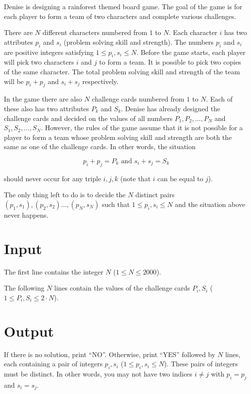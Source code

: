 

Denise is designing a rainforest themed board game. The goal of the game is for each player to form a 
team of two characters and complete various challenges.

There are $N$ different characters numbered from $1$ to $N$.
Each character $i$ has two attributes $p_i$ and $s_i$ (problem solving skill and strength).
The numbers $p_i$ and $s_i$ are positive integers satisfying $1 \leq p_i, s_i \leq N$.
Before the game starts, each player will pick two characters $i$ and $j$ to form a team. 
It is possible to pick two copies of the same character.
The total problem solving skill and strength of the team will be $p_i + p_j$ and $s_i + s_j$
respectively. 

In the game there are also $N$ challenge cards numbered from $1$ to $N$. Each of these also
has two attributes $P_k$ and $S_k$. Denise has already designed the challenge cards and 
decided on the values of all numbers $P_1, P_2, \dots, P_N$ and $S_1, S_2, \dots, S_N$. 
However, the rules of the game assume that it is not possible for a player to form a team
whose problem solving skill and strength are both the same as one of the challenge cards. In other 
words, the situation 

$$p_i+p_j = P_k \text{ and } s_i+s_j = S_k$$

should never occur for any triple $i,j,k$ (note that $i$ can be equal to $j$).

The only thing left to do is to decide the $N$ distinct pairs $(p_1, s_1), (p_2, s_2) \dots, (p_N, s_N)$ such
that $1 \leq p_i, s_i \leq N$ and the situation above never happens.

\section*{Input}
The first line contains the integer $N$ ($1 \leq N \leq 2000$).

The following $N$ lines contain the values of the challenge cards $P_i, S_i$ ($1 \leq P_i, S_i \leq 2 \cdot N$).

\section*{Output}

If there is no solution, print ``NO''. Otherwise, print ``YES'' followed by $N$ lines, 
each containing a pair of integers $p_i, s_i$ ($1 \leq p_i, s_i \leq N$). These pairs 
of integers must be distinct. In other words, you may not have two indices $i \neq j$
with $p_i = p_j$ and $s_i = s_j$.
